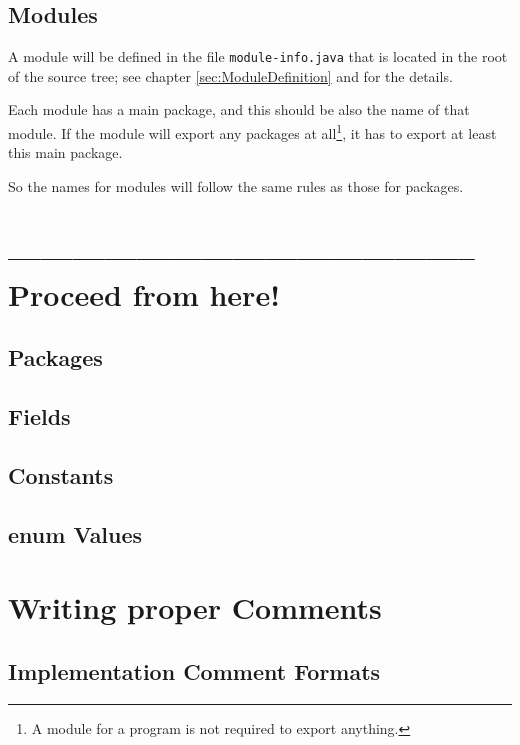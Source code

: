 \documentclass[12pt,a4paper,titlepage, parskip=half, headsepline, footsepline, cleardoubleplain]{scrbook}
\begin{document}
\section{Modules}\label{sec:Modules}
A module will be defined in the file \verb#module-info.java# that is located in the root of the source tree; see chapter \vref{sec:ModuleDefinition} and \autocite{ORACLE_DOC_LANGUAGE_SPECIFICATION:ModuleDeclarations} for the details.

Each module has a main package, and this should be also the name of that module. If the module will export any packages at all\footnote{A module for a program is not required to export anything.}, it has to export at least this main package.

So the names for modules will follow the same rules as those for packages.

\chapter{-------------------------------------------- Proceed from here!}





\section{Packages}\label{sec:Packages}

\section{Fields}\label{sec:Fields}

\section{Constants}\label{sec:Constants}

\section{enum Values}\label{sec:EnumValues}

\chapter{Writing proper Comments}\label{sec:WritingProperComments}

\section{Implementation Comment Formats}
\end{document}
